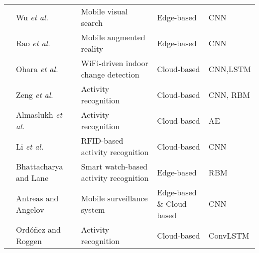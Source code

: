 \documentclass[journal,comsoc,letter]{IEEEtran}
\begin{document}
\begin{table*}[t!]
\begin{tabular}{|c|C{3.5cm}|C{5cm}|C{1.8cm}|C{2.3cm}|}
                                            & Wu \emph{et al.} \cite{liu2017deep}                           & Mobile visual search                                                          & Edge-based                     & CNN                      \\  
                                             & Rao \emph{et al.} \cite{rao2017mobile}                        & Mobile augmented reality                                                      & Edge-based                     & CNN                      \\  
                                            & Ohara \emph{et al.} \cite{ohara2017detecting}                 & WiFi-driven indoor change detection                                           & Cloud-based                    & CNN,LSTM                 \\  
                                             & Zeng \emph{et al.} \cite{zeng2014convolutional}               & Activity recognition                                                          & Cloud-based                    & CNN, RBM                 \\  
                                             & Almaslukh \emph{et al.} \cite{almaslukh2017effective}         & Activity recognition                                                          & Cloud-based                    & AE                       \\  
                                             & Li \emph{et al.} \cite{li2016deep22}                          & RFID-based activity recognition                                               & Cloud-based                    & CNN                      \\  
                                             & Bhattacharya and Lane \cite{bhattacharya2016smart}            & Smart watch-based activity recognition                                        & Edge-based                     & RBM                      \\  
                                             & Antreas and Angelov \cite{antoniou2016general}                & Mobile surveillance system                                                    & Edge-based \& Cloud based      & CNN                      \\  
                                             & Ord{\'o}{\~n}ez and Roggen \cite{ordonez2016deep}             & Activity recognition                                                          & Cloud-based                    & ConvLSTM                 \\  

\end{tabular}
\end{table*}
\end{document}
